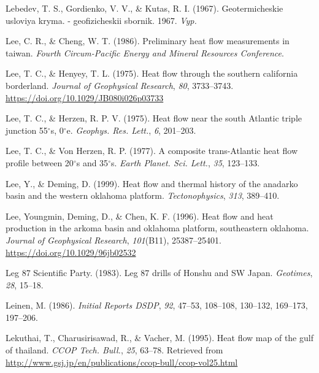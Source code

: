 \documentclass[draft,linenumbers]{agujournal2018}
\begin{document}
\leavevmode{}%
Lebedev, T. S., Gordienko, V. V., \& Kutas, R. I. (1967).
Geotermicheskie usloviya kryma. - geofizicheskii sbornik. 1967.
\emph{Vyp.}

\leavevmode{}%
Lee, C. R., \& Cheng, W. T. (1986). Preliminary heat flow measurements
in taiwan. \emph{Fourth Circum-Pacific Energy and Mineral Resources
Conference}.

\leavevmode{}%
Lee, T. C., \& Henyey, T. L. (1975). Heat flow through the southern
california borderland. \emph{Journal of Geophysical Research},
\emph{80}, 3733--3743. \url{https://doi.org/10.1029/JB080i026p03733}

\leavevmode{}%
Lee, T. C., \& Herzen, R. P. V. (1975). Heat flow near the south
{Atlantic} triple junction 55\(^\circ\)s, 0\(^\circ\)e. \emph{Geophys.
Res. Lett.}, \emph{6}, 201--203.

\leavevmode{}%
Lee, T. C., \& Von Herzen, R. P. (1977). A composite {trans-Atlantic}
heat flow profile between 20\(^\circ\)s and 35\(^\circ\)s. \emph{Earth
Planet. Sci. Lett.}, \emph{35}, 123--133.

\leavevmode{}%
Lee, Y., \& Deming, D. (1999). Heat flow and thermal history of the
anadarko basin and the western oklahoma platform. \emph{Tectonophysics},
\emph{313}, 389--410.

\leavevmode{}%
Lee, Youngmin, Deming, D., \& Chen, K. F. (1996). Heat flow and heat
production in the arkoma basin and oklahoma platform, southeastern
oklahoma. \emph{Journal of Geophysical Research}, \emph{101}(B11),
25387--25401. \url{https://doi.org/10.1029/96jb02532}

\leavevmode{}%
Leg 87 Scientific Party. (1983). Leg 87 drills of {Honshu and SW Japan}.
\emph{Geotimes}, \emph{28}, 15--18.

\leavevmode{}%
Leinen, M. (1986). \emph{Initial Reports DSDP}, \emph{92}, 47--53,
108--108, 130--132, 169--173, 197--206.

\leavevmode{}%
Lekuthai, T., Charusirisawad, R., \& Vacher, M. (1995). Heat flow map of
the gulf of thailand. \emph{CCOP Tech. Bull.}, \emph{25}, 63--78.
Retrieved from
\url{http://www.gsj.jp/en/publications/ccop-bull/ccop-vol25.html}
\end{document}
